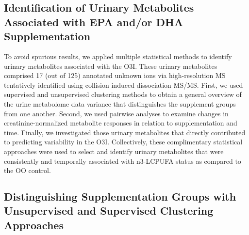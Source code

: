 \documentclass[journal=jacsat,manuscript=article]{achemso}
\begin{document}
\subsection{Identification of Urinary Metabolites Associated with EPA
and/or DHA
Supplementation}\label{identification-of-urinary-metabolites-associated-with-epa-andor-dha-supplementation}

To avoid spurious results, we applied multiple statistical methods to
identify urinary metabolites associated with the O3I. These urinary
metabolites comprised 17 (out of 125) annotated unknown ions via
high-resolution MS tentatively identified using collision induced
dissociation MS/MS. First, we used supervised and unsupervised
clustering methods to obtain a general overview of the urine metabolome
data variance that distinguishes the supplement groups from one another.
Second, we used pairwise analyses to examine changes in
creatinine-normalized metabolite responses in relation to
supplementation and time. Finally, we investigated those urinary
metabolites that directly contributed to predicting variability in the
O3I. Collectively, these complimentary statistical approaches were used
to select and identify urinary metabolites that were consistently and
temporally associated with n3-LCPUFA status as compared to the OO
control.

\subsection{Distinguishing Supplementation Groups with Unsupervised and
Supervised Clustering
Approaches}\label{distinguishing-supplementation-groups-with-unsupervised-and-supervised-clustering-approaches}
\end{document}
